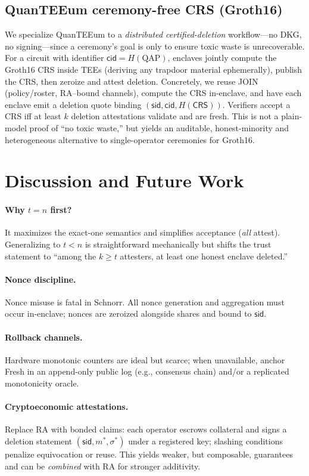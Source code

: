 \documentclass[runningheads,orivec]{llncs}
\newcommand{\prot}{\textsf{QuanTEEum}}
\newcommand{\sid}{\mathsf{sid}}
\begin{document}
\subsection{QuanTEEum ceremony-free CRS (Groth16)}
We specialize \prot{} to a \emph{distributed certified-deletion} workflow—no DKG, no signing—since a ceremony’s goal is only to ensure toxic waste is unrecoverable. For a circuit with identifier $\mathsf{cid}=H(\text{QAP})$, enclaves jointly compute the Groth16 CRS inside TEEs (deriving any trapdoor material ephemerally), publish the CRS, then zeroize and attest deletion. Concretely, we reuse JOIN (policy/roster, RA–bound channels), compute the CRS in-enclave, and have each enclave emit a deletion quote binding $(\sid,\mathsf{cid},H(\mathsf{CRS}))$. Verifiers accept a CRS iff at least $k$ deletion attestations validate and are fresh. This is not a plain-model proof of “no toxic waste,” but yields an auditable, honest-minority and heterogeneous alternative to single-operator ceremonies for Groth16.

\section{Discussion and Future Work}\label{sec:discussion}
\paragraph{Why $t\!=\!n$ first?}
It maximizes the exact-one semantics and simplifies acceptance (\emph{all} attest). Generalizing to $t<n$ is straightforward mechanically but shifts the trust statement to “among the $k\!\ge\!t$ attesters, at least one honest enclave deleted.”

\paragraph{Nonce discipline.}
Nonce misuse is fatal in Schnorr. All nonce generation and aggregation must occur in-enclave; nonces are zeroized alongside shares and bound to $\sid$.

\paragraph{Rollback channels.}
Hardware monotonic counters are ideal but scarce; when unavailable, anchor \textsf{Fresh} in an append-only public log (e.g., consensus chain) and/or a replicated monotonicity oracle.

\paragraph{Cryptoeconomic attestations.}
Replace RA with bonded claims: each operator escrows collateral and signs a deletion statement $(\sid,m^{*},\sigma^{*})$ under a registered key; slashing conditions penalize equivocation or reuse. This yields weaker, but composable, guarantees and can be \emph{combined} with RA for stronger additivity.
\end{document}
